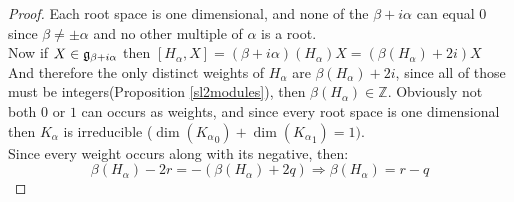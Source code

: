 \begin{proof}
	Each root space is one dimensional, and none of the $\beta+i\alpha$ can equal $0$ since $\beta \not= \pm \alpha$ and no other multiple of $\alpha$ is a root.\\
	Now if $X \in \mathfrak{g}_{\beta+i\alpha}$ then $[H_\alpha,X]=(\beta+i\alpha)(H_\alpha)X = (\beta(H_\alpha)+2i)X$
	And therefore the only distinct weights of $H_\alpha$ are $\beta(H_\alpha)+2i$, since all of those must be integers(Proposition \ref{sl2modules}), then $\beta(H_\alpha) \in \mathbb{Z}$. Obviously not both $0$ or $1$ can occurs as weights, and since every root space is one dimensional then $K_\alpha$ is irreducible ($\dim({K_\alpha}_0)+\dim({K_\alpha}_1)=1)$.\\
	Since every weight occurs along with its negative, then:\\
	$$\beta(H_\alpha)-2r=-(\beta(H_\alpha)+2q) \Rightarrow \beta(H_\alpha) = r-q$$
\end{proof}
